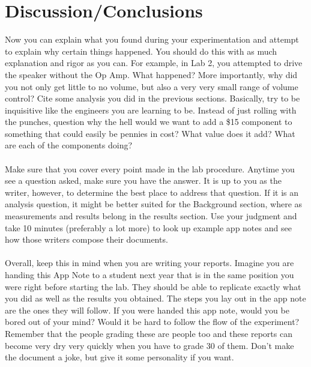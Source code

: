 \documentclass{hitec}
\begin{document}
\section{Discussion/Conclusions}
Now you can explain what you found during your experimentation and attempt to explain why certain things happened. You should do this with as much explanation and rigor as you can. For example, in Lab 2, you attempted to drive the speaker without the Op Amp. What happened? More importantly, why did you not only get little to no volume, but also a very very small range of volume control? Cite some analysis you did in the previous sections. Basically, try to be inquisitive like the engineers you are learning to be. Instead of just rolling with the punches, question why the hell would we want to add a \$15 component to something that could easily be pennies in cost? What value does it add? What are each of the components doing?
\\
\\
\noindent
Make sure that you cover every point made in the lab procedure. Anytime you see a question asked, make sure you have the answer. It is up to you as the writer, however, to determine the best place to address that question. If it is an analysis question, it might be better suited for the Background section, where as measurements and results belong in the results section. Use your judgment and take 10 minutes (preferably a lot more) to look up example app notes and see how those writers compose their documents.
\\
\\
\noindent
Overall, keep this in mind when you are writing your reports. Imagine you are handing this App Note to a student next year that is in the same position you were right before starting the lab. They should be able to replicate exactly what you did as well as the results you obtained. The steps you lay out in the app note are the ones they will follow. If you were handed this app note, would you be bored out of your mind? Would it be hard to follow the flow of the experiment? Remember that the people grading these are people too and these reports can become very dry very quickly when you have to grade 30 of them. Don't make the document a joke, but give it some personality if you want.

\fi
\end{document}
